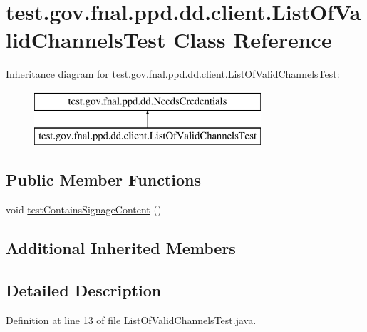 \hypertarget{classtest_1_1gov_1_1fnal_1_1ppd_1_1dd_1_1client_1_1ListOfValidChannelsTest}{\section{test.\-gov.\-fnal.\-ppd.\-dd.\-client.\-List\-Of\-Valid\-Channels\-Test Class Reference}
\label{classtest_1_1gov_1_1fnal_1_1ppd_1_1dd_1_1client_1_1ListOfValidChannelsTest}
}
Inheritance diagram for test.\-gov.\-fnal.\-ppd.\-dd.\-client.\-List\-Of\-Valid\-Channels\-Test\-:\begin{figure}[H]
\begin{center}
\leavevmode
\includegraphics[height=2.000000cm]{classtest_1_1gov_1_1fnal_1_1ppd_1_1dd_1_1client_1_1ListOfValidChannelsTest}
\end{center}
\end{figure}
\subsection*{Public Member Functions}
\begin{DoxyCompactItemize}
\item 
void \hyperlink{classtest_1_1gov_1_1fnal_1_1ppd_1_1dd_1_1client_1_1ListOfValidChannelsTest_a07ce50724c9048adc013081accbb99c4}{test\-Contains\-Signage\-Content} ()
\end{DoxyCompactItemize}
\subsection*{Additional Inherited Members}


\subsection{Detailed Description}


Definition at line 13 of file List\-Of\-Valid\-Channels\-Test.\-java.



